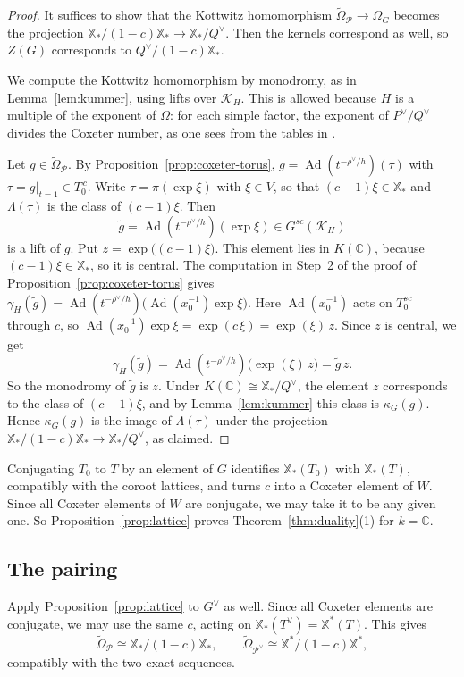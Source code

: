 \documentclass[psamsfonts]{amsart}
\theoremstyle{definition}
\theoremstyle{remark}
\numberwithin{equation}{section}
\newcommand{\X}{\mathbb{X}}
\newcommand{\ra}{\rightarrow}
\newcommand{\tOm}{\widetilde{\Omega}}
\DeclareMathOperator{\Ad}{Ad}
\newcommand\cK{\mathcal{K}}
\newcommand\cP{\mathcal{P}}
\newcommand{\CC}{\mathbb{C}}
\numberwithin{equation}{section}
\newcommand{\Om}{\Omega}
\theoremstyle{plain}
\begin{document}
\begin{proof}
It suffices to show that the Kottwitz homomorphism $\tOm_\cP\ra\Om_G$ becomes the projection $\X_*/(1-c)\X_*\ra\X_*/Q^\vee$. Then the kernels correspond as well, so $Z(G)$ corresponds to $Q^\vee/(1-c)\X_*$.

We compute the Kottwitz homomorphism by monodromy, as in Lemma~\ref{lem:kummer}, using lifts over $\cK_H$. This is allowed because $H$ is a multiple of the exponent of $\Om$: for each simple factor, the exponent of $P^\vee/Q^\vee$ divides the Coxeter number, as one sees from the tables in \cite{Bou02}.

Let $g\in \tOm_\cP$. By Proposition~\ref{prop:coxeter-torus}, $g=\Ad(t^{-\rho^\vee/h})(\tau)$ with $\tau=g|_{t=1}\in T_0^{\,c}$. Write $\tau=\pi(\exp\xi)$ with $\xi\in V$, so that $(c-1)\xi\in\X_*$ and $\Lambda(\tau)$ is the class of $(c-1)\xi$. Then
\[
\tilde g=\Ad(t^{-\rho^\vee/h})(\exp\xi)\in G^{sc}(\cK_H)
\]
is a lift of $g$. Put $z=\exp\big((c-1)\xi\big)$. This element lies in $K(\CC)$, because $(c-1)\xi\in\X_*$, so it is central. The computation in Step~2 of the proof of Proposition~\ref{prop:coxeter-torus} gives $\gamma_H(\tilde g)=\Ad(t^{-\rho^\vee/h})\big(\Ad(x_0^{-1})\exp\xi\big)$. Here $\Ad(x_0^{-1})$ acts on $T_0^{sc}$ through $c$, so $\Ad(x_0^{-1})\exp\xi=\exp(c\,\xi)=\exp(\xi)\,z$. Since $z$ is central, we get
\[
\gamma_H(\tilde g)=\Ad(t^{-\rho^\vee/h})\big(\exp(\xi)\,z\big)=\tilde g\,z.
\] So the monodromy of $\tilde g$ is $z$. Under $K(\CC)\cong\X_*/Q^\vee$, the element $z$ corresponds to the class of $(c-1)\xi$, and by Lemma~\ref{lem:kummer} this class is $\kappa_G(g)$. Hence $\kappa_G(g)$ is the image of $\Lambda(\tau)$ under the projection $\X_*/(1-c)\X_*\ra\X_*/Q^\vee$, as claimed.
\end{proof}

Conjugating $T_0$ to $T$ by an element of $G$ identifies $\X_*(T_0)$ with $\X_*(T)$, compatibly with the coroot lattices, and turns $c$ into a Coxeter element of $W$. Since all Coxeter elements of $W$ are conjugate, we may take it to be any given one. So Proposition~\ref{prop:lattice} proves Theorem~\ref{thm:duality}(1) for $k=\CC$.

\subsection{The pairing}\label{subsec:pairing}
Apply Proposition~\ref{prop:lattice} to $G^\vee$ as well. Since all Coxeter elements are conjugate, we may use the same $c$, acting on $\X_*(T^\vee)=\X^*(T)$. This gives
\[
\tOm_\cP\cong\X_*/(1-c)\X_*,\qquad \tOm_{\cP^\vee}\cong\X^*/(1-c)\X^*,
\]
compatibly with the two exact sequences.
\end{document}
